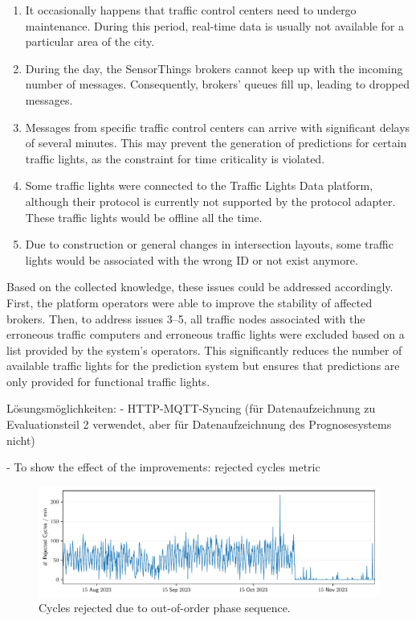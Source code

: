 \begin{enumerate}
    \item It occasionally happens that traffic control centers need to undergo maintenance. During this period, real-time data is usually not available for a particular area of the city.
    \item During the day, the SensorThings brokers cannot keep up with the incoming number of messages. Consequently, brokers' queues fill up, leading to dropped messages.
    \item Messages from specific traffic control centers can arrive with significant delays of several minutes. This may prevent the generation of predictions for certain traffic lights, as the constraint for time criticality is violated.
    \item Some traffic lights were connected to the Traffic Lights Data platform, although their protocol is currently not supported by the protocol adapter. These traffic lights would be offline all the time.
    \item Due to construction or general changes in intersection layouts, some traffic lights would be associated with the wrong ID or not exist anymore.
\end{enumerate}

Based on the collected knowledge, these issues could be addressed accordingly. First, the platform operators were able to improve the stability of affected brokers. Then, to address issues 3--5, all traffic nodes associated with the erroneous traffic computers and erroneous traffic lights were excluded based on a list provided by the system's operators. This significantly reduces the number of available traffic lights for the prediction system but ensures that predictions are only provided for functional traffic lights.

Lösungsmöglichkeiten:
- HTTP-MQTT-Syncing (für Datenaufzeichnung zu Evaluationsteil 2 verwendet, aber für Datenaufzeichnung des Prognosesystems nicht)

- To show the effect of the improvements: rejected cycles metric

\begin{figure}
    \centering
    \includegraphics[width=\linewidth]{images/monitoring-rejected-cycles.pdf}
    \caption{Cycles rejected due to out-of-order phase sequence.}\label{fig:monitoring-rejected-cycles}
\end{figure}


